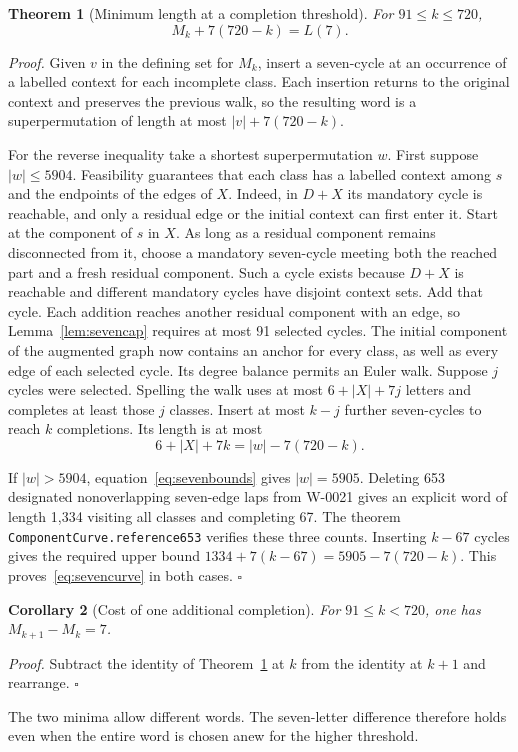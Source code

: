 \documentclass[11pt]{article}
\newtheorem{theorem}{Theorem}[section]
\newtheorem{corollary}[theorem]{Corollary}
\newenvironment{proof}[1][Proof]{\par\smallskip\noindent\textit{#1.}\enspace}{\unskip\nobreak\hfill\ensuremath{\square}\par\smallskip}
\begin{document}
\begin{theorem}[Minimum length at a completion threshold]\label{thm:sevencurve}
For $91\le k\le720$,
\begin{equation}
  M_k+7(720-k)=L(7).\label{eq:sevencurve}
\end{equation}
\end{theorem}

\begin{proof}
Given $v$ in the defining set for $M_k$, insert a seven-cycle at an
occurrence of a labelled context for each incomplete class. Each insertion
returns to the original context and preserves the previous walk, so the
resulting word is a superpermutation of length at most
$|v|+7(720-k)$.

For the reverse inequality take a shortest superpermutation $w$. First
suppose $|w|\le5904$. Feasibility guarantees that each class has a
labelled context among $s$ and the endpoints of the edges of $X$. Indeed,
in $D+X$ its mandatory cycle is reachable, and only a residual edge or
the initial context can first enter it. Start at the component of $s$ in
$X$. As long as a residual component remains disconnected from it, choose
a mandatory seven-cycle meeting both the reached part and a fresh
residual component. Such a cycle exists because $D+X$ is reachable and
different mandatory cycles have disjoint context sets. Add that cycle.
Each addition reaches another residual component with an edge, so
Lemma~\ref{lem:sevencap} requires at most 91 selected cycles. The initial
component of the augmented graph now contains an anchor for every class,
as well as every edge of each selected cycle. Its degree balance permits an Euler walk. Suppose $j$ cycles were selected. Spelling the walk uses at most $6+|X|+7j$ letters and completes at least those $j$ classes. Insert at most $k-j$ further seven-cycles to reach $k$ completions. Its length is at most
\[
  6+|X|+7k=|w|-7(720-k).
\]

If $|w|>5904$, equation~\eqref{eq:sevenbounds} gives $|w|=5905$.
Deleting 653 designated nonoverlapping seven-edge laps from W-0021
gives an explicit word of length 1,334 visiting all classes and
completing 67. The theorem \texttt{ComponentCurve.reference653} verifies these
three counts. Inserting $k-67$ cycles gives the required upper bound
$1334+7(k-67)=5905-7(720-k)$. This proves~\eqref{eq:sevencurve}
in both cases.
\end{proof}

\begin{corollary}[Cost of one additional completion]\label{cor:marginal}
For $91\le k<720$, one has $M_{k+1}-M_k=7$.
\end{corollary}
\begin{proof}
Subtract the identity of Theorem~\ref{thm:sevencurve} at $k$ from the identity at $k+1$ and rearrange.
\end{proof}
The two minima allow different words. The seven-letter difference therefore holds even when the entire word is chosen anew for the higher threshold.
\end{document}
